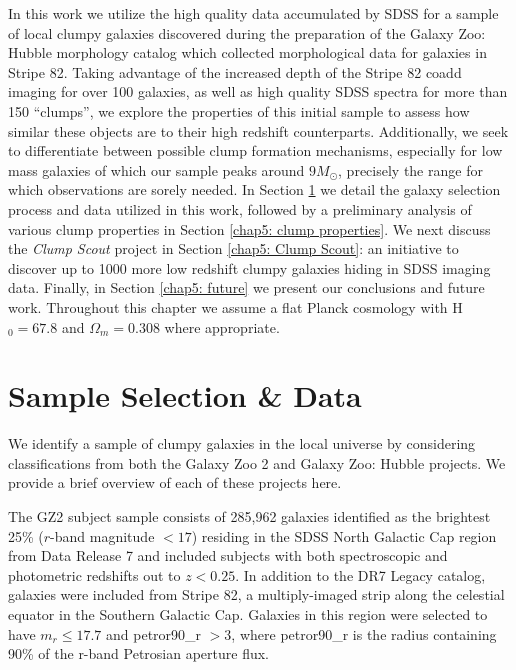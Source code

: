 In this work we utilize the high quality data accumulated by SDSS for a sample of local clumpy galaxies discovered during the preparation of the Galaxy Zoo: Hubble morphology catalog which collected morphological data for galaxies in Stripe 82. Taking advantage of the increased depth of the Stripe 82 coadd imaging for over 100 galaxies, as well as high quality SDSS spectra for more than 150 ``clumps'', we explore the properties of this initial sample to assess how similar these objects are to their high redshift counterparts. Additionally, we seek to differentiate between possible clump formation mechanisms, especially for low mass galaxies of which our sample peaks around $9M_{\odot}$, precisely the range for which observations are sorely needed. In Section \ref{chap5: data} we detail the galaxy selection process and data utilized in this work, followed by a preliminary analysis of various clump properties in Section \ref{chap5: clump properties}. We next discuss the \textit{Clump Scout} project in Section \ref{chap5: Clump Scout}: an initiative to discover up to 1000 more low redshift clumpy galaxies hiding in SDSS imaging data. Finally, in Section \ref{chap5: future} we present our conclusions and future work. Throughout this chapter we assume a flat Planck cosmology with H$_0=67.8$ and $\Omega_m = 0.308$ where appropriate. 


\section{Sample Selection \& Data} \label{chap5: data}

We identify a sample of clumpy galaxies in the local universe by considering classifications from both the Galaxy Zoo 2 \citep[GZ2][]{Willett2013} and Galaxy Zoo: Hubble \citep[GZH][]{Willett2017} projects. We provide a brief overview of each of these projects here. 

The GZ2 subject sample consists of 285,962 galaxies identified as the brightest 25\% ($r$-band magnitude $< 17$) residing in the SDSS North Galactic Cap region from Data Release 7 and included subjects with both spectroscopic and photometric redshifts out to $z < 0.25$. In addition to the DR7 Legacy catalog, galaxies were included from Stripe 82, a multiply-imaged strip along the celestial equator in the Southern Galactic Cap. Galaxies in this region were selected to have $m_r\le17.7$ and petror90\_r $>3$, where petror90\_r is the radius containing 90\% of the r-band Petrosian aperture flux.




